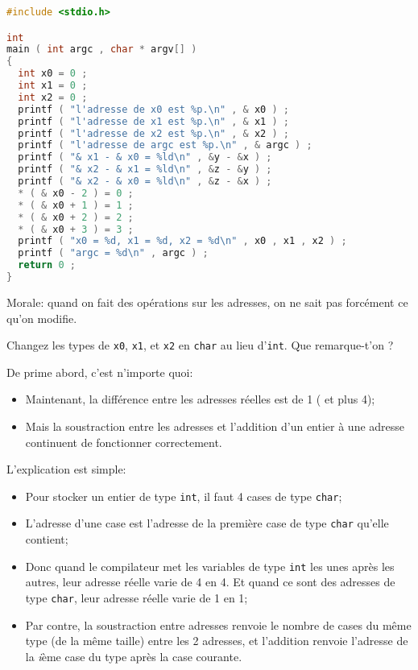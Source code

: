 \begin{solutioncachee}
  \begin{lstlisting}[language=C]
#include <stdio.h>

int
main ( int argc , char * argv[] )
{
  int x0 = 0 ;
  int x1 = 0 ;
  int x2 = 0 ;
  printf ( "l'adresse de x0 est %p.\n" , & x0 ) ;
  printf ( "l'adresse de x1 est %p.\n" , & x1 ) ;
  printf ( "l'adresse de x2 est %p.\n" , & x2 ) ;
  printf ( "l'adresse de argc est %p.\n" , & argc ) ;
  printf ( "& x1 - & x0 = %ld\n" , &y - &x ) ;
  printf ( "& x2 - & x1 = %ld\n" , &z - &y ) ;
  printf ( "& x2 - & x0 = %ld\n" , &z - &x ) ;
  * ( & x0 - 2 ) = 0 ;
  * ( & x0 + 1 ) = 1 ;
  * ( & x0 + 2 ) = 2 ;
  * ( & x0 + 3 ) = 3 ;
  printf ( "x0 = %d, x1 = %d, x2 = %d\n" , x0 , x1 , x2 ) ;
  printf ( "argc = %d\n" , argc ) ;
  return 0 ;
}    
  \end{lstlisting}
  Morale: quand on fait des opérations sur les adresses, on ne sait
  pas forcément ce qu'on modifie. 
\end{solutioncachee}

\question Changez les types de \texttt{x0}, \texttt{x1}, et
\texttt{x2} en \texttt{char} au lieu d'\texttt{int}. Que remarque-t'on
?

\begin{solutioncachee}
  De prime abord, c'est n'importe quoi:
  \begin{itemize}
  \item Maintenant, la différence entre les adresses réelles est de 1 ( et plus 4);
  \item Mais la soustraction entre les adresses et l'addition d'un entier à une adresse
    continuent de fonctionner correctement.
  \end{itemize}
  L'explication est simple:
  \begin{itemize}
  \item Pour stocker un entier de type \texttt{int}, il faut 4 cases
    de type \texttt{char};
  \item L'adresse d'une case est l'adresse de la première case de type
    \texttt{char} qu'elle contient;
  \item Donc quand le compilateur met les variables de type
    \texttt{int} les unes après les autres, leur adresse réelle varie
    de 4 en 4. Et quand ce sont des adresses de type \texttt{char},
    leur adresse réelle varie de 1 en 1;
  \item Par contre, la soustraction entre adresses renvoie le nombre
    de cases du même type (de la même taille) entre les 2 adresses, et
    l'addition renvoie l'adresse de la \textit{i}ème case du type
    après la case courante.
  \end{itemize}
\end{solutioncachee}

